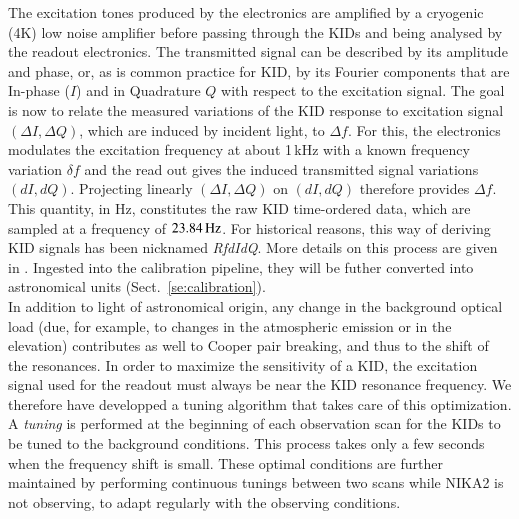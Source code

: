 The excitation tones produced by the
electronics are amplified by a cryogenic (4K) low noise amplifier
before passing through the KIDs and being analysed by the readout
electronics. The transmitted signal can be described by its
amplitude and phase, or, as is common practice for KID, by its Fourier
components that are In-phase ($I$) and in Quadrature $Q$ with respect to the excitation
signal.
The goal is now to relate the measured variations of the KID response
to excitation signal $(\Delta I, \Delta Q)$, which are induced by incident light, to
$\Delta f$. For this, the electronics modulates the excitation
frequency at about 1\,kHz with a known frequency variation $\delta f$
and the read out gives the induced transmitted signal variations
$(dI, dQ)$. Projecting linearly $(\Delta I, \Delta Q)$ on $(dI, dQ)$ therefore
provides $\Delta f$. This quantity, in Hz, constitutes the raw KID
time-ordered data, which are sampled at a frequency of
$23.84\,\rm{Hz}$. For historical reasons, this way of deriving KID
signals has been nicknamed \emph{RfdIdQ}. More details on this process
are given in \citet{Calvo2013}.
Ingested into the calibration pipeline, they will be futher converted
into astronomical units (Sect.~\ref{se:calibration}).\\

In addition to light of astronomical origin, any change in the
background optical load (due, for example, to changes in
the atmospheric emission or in the elevation) contributes as well to
Cooper pair breaking, and thus to the shift of the resonances. In
order to maximize the sensitivity of a KID, the
excitation signal used for the readout must always be near the KID resonance
frequency. We therefore have developped a tuning algorithm that takes care of
this optimization. A \emph{tuning} is performed at the beginning
of each observation scan for the KIDs to be tuned to the background
conditions.
This process takes only a few seconds
when the frequency shift is small.
These optimal conditions are further maintained by performing
continuous tunings between two scans while NIKA2 is not observing, to
adapt regularly with the observing conditions.

